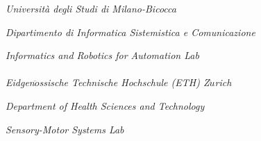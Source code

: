 \documentclass[a4paper,12pt, oneside]{book}
\begin{document}
\begin{titlepage}

 \noindent
 \textit{Università degli Studi di Milano-Bicocca}
 
 \noindent
 \textit{Dipartimento di Informatica Sistemistica e Comunicazione}
 
 \noindent
 \textit{Informatics and Robotics for Automation Lab}\\

    \noindent \\
    \textit{Eidgen$\ddot{o}$ssische Technische Hochschule (ETH) Z$\ddot{u}$rich}

    \noindent
    \textit{Department of Health Sciences and Technology}

    \noindent
    \textit{Sensory-Motor Systems Lab} \\

    \begin{figure}[b]

            \hspace{\fill}
            \hspace{\fill}
            \hspace{\fill}
            \hspace{\fill}
           
\end{figure}
\end{titlepage}
\end{document}
